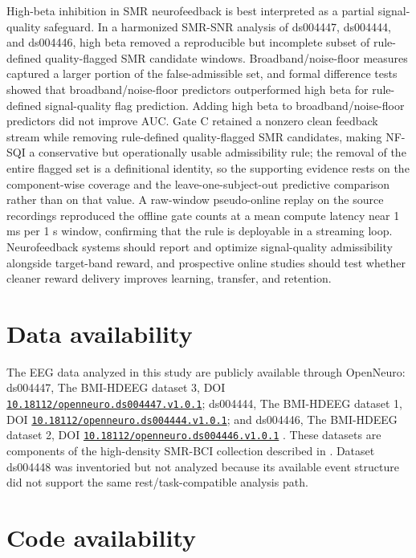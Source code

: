 \documentclass[preprint,12pt]{elsarticle}
\newcommand{\doiurl}[1]{\href{https://doi.org/#1}{\nolinkurl{#1}}}
\begin{document}
High-beta inhibition in SMR neurofeedback is best interpreted as a partial signal-quality safeguard. In a harmonized SMR-SNR analysis of ds004447, ds004444, and ds004446, high beta removed a reproducible but incomplete subset of rule-defined quality-flagged SMR candidate windows. Broadband/noise-floor measures captured a larger portion of the false-admissible set, and formal difference tests showed that broadband/noise-floor predictors outperformed high beta for rule-defined signal-quality flag prediction. Adding high beta to broadband/noise-floor predictors did not improve AUC. Gate C retained a nonzero clean feedback stream while removing rule-defined quality-flagged SMR candidates, making NF-SQI a conservative but operationally usable admissibility rule; the removal of the entire flagged set is a definitional identity, so the supporting evidence rests on the component-wise coverage and the leave-one-subject-out predictive comparison rather than on that value. A raw-window pseudo-online replay on the source recordings reproduced the offline gate counts at a mean compute latency near 1 ms per 1 s window, confirming that the rule is deployable in a streaming loop. Neurofeedback systems should report and optimize signal-quality admissibility alongside target-band reward, and prospective online studies should test whether cleaner reward delivery improves learning, transfer, and retention.

\FloatBarrier

\section*{Data availability}

The EEG data analyzed in this study are publicly available through OpenNeuro: ds004447, The BMI-HDEEG dataset 3, DOI \doiurl{10.18112/openneuro.ds004447.v1.0.1}; ds004444, The BMI-HDEEG dataset 1, DOI \doiurl{10.18112/openneuro.ds004444.v1.0.1}; and ds004446, The BMI-HDEEG dataset 2, DOI \doiurl{10.18112/openneuro.ds004446.v1.0.1} \citep{OpenNeuroDS004444,OpenNeuroDS004446,OpenNeuroDS004447}. These datasets are components of the high-density SMR-BCI collection described in \citep{Iwama2023HDEEG}. Dataset ds004448 was inventoried but not analyzed because its available event structure did not support the same rest/task-compatible analysis path.

\section*{Code availability}
\end{document}
